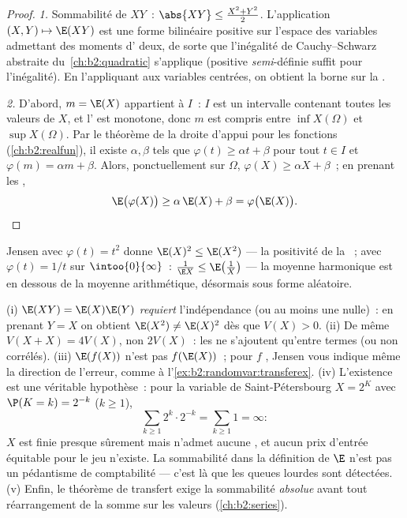 \begin{proof}
\emph{1.} Sommabilité de $XY$~: $\abs{XY} \leq \frac{X^2 + Y^2}2$.
L'application $(X, Y) \mapsto \E(XY)$ est une forme bilinéaire
 positive sur l'espace des variables admettant des moments d' deux, de
sorte que l'inégalité de Cauchy--Schwarz abstraite
du~\cref{ch:b2:quadratic} s'applique (positive \emph{semi}-définie
suffit pour l'inégalité). En l'appliquant aux variables centrées, on
obtient la borne sur la .

\emph{2.} D'abord, $m = \E(X)$ appartient à $I$~: $I$ est un intervalle
contenant toutes les valeurs de $X$, et l' est monotone, donc $m$
est compris entre $\inf X(\Omega)$ et $\sup X(\Omega)$. Par le
théorème de la droite d'appui pour les fonctions 
(\cref{ch:b2:realfun}), il existe $\alpha, \beta$ tels que
$\varphi(t) \geq \alpha t + \beta$ pour tout $t \in I$ et
$\varphi(m) = \alpha m + \beta$. Alors, ponctuellement sur $\Omega$,
$\varphi(X) \geq \alpha X + \beta$~; en prenant les ,
\[
\E\bigl(\varphi(X)\bigr) \geq \alpha\,\E(X) + \beta
= \varphi\bigl(\E(X)\bigr). \qedhere
\]
\end{proof}

\begin{example}
Jensen avec $\varphi(t) = t^2$ donne $\E(X)^2 \leq \E(X^2)$ ---
la positivité de la ~; avec $\varphi(t) = 1/t$ sur
$\intoo{0}{\infty}$~: $\frac{1}{\E X} \leq \E\bigl(\frac1X\bigr)$
--- la moyenne harmonique est en dessous de la moyenne arithmétique,
désormais sous forme aléatoire.
\end{example}

\begin{remark}
(i) $\E(XY) = \E(X)\E(Y)$ \emph{requiert} l'indépendance (ou au
moins une  nulle)~: en prenant $Y = X$ on obtient $\E(X^2) \neq
\E(X)^2$ dès que $V(X) > 0$. (ii) De même $V(X + X) =
4V(X)$, non $2V(X)$~: les  ne s'ajoutent qu'entre termes
 (ou non corrélés). (iii) $\E(f(X))$ n'est pas
$f(\E(X))$~; pour $f$ , Jensen vous indique même la
direction de l'erreur, comme à l'\cref{ex:b2:randomvar:transferex}.
(iv) L'existence est une véritable hypothèse~: pour la variable de
Saint-Pétersbourg $X = 2^K$ avec
$\P(K = k) = 2^{-k}$ ($k \geq 1$),
\[
\sum_{k\geq1}2^k\cdot2^{-k} = \sum_{k\geq1}1 = \infty :
\]
$X$ est finie presque sûrement mais n'admet aucune , et
aucun prix d'entrée équitable pour le jeu n'existe. La sommabilité
dans la définition de $\E$ n'est pas un pédantisme de comptabilité ---
c'est là que les queues lourdes sont détectées. (v) Enfin, le
théorème de transfert exige la sommabilité \emph{absolue} avant tout
réarrangement de la somme sur les valeurs
(\cref{ch:b2:series}).
\end{remark}


